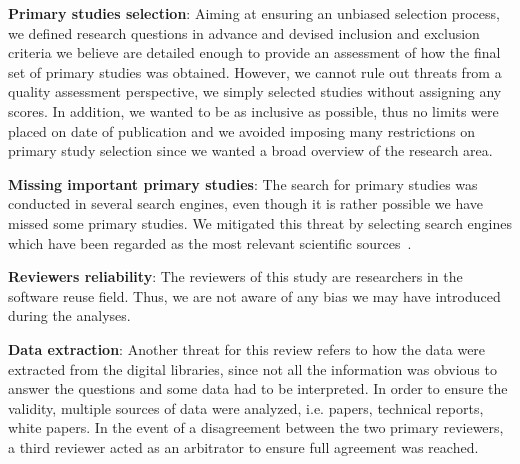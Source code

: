 
\textbf{Primary studies selection}: Aiming at ensuring an unbiased selection process, we defined research questions in advance and devised inclusion and exclusion criteria we believe are detailed enough to provide an assessment of how the final set of primary studies was obtained. However, we cannot rule out threats from a quality assessment perspective, we simply selected studies without assigning any scores. In addition, we wanted to be as inclusive as possible, thus no limits were placed on date of publication and we avoided imposing many restrictions on primary study selection since we wanted a broad overview of the research area. 

\textbf{Missing important primary studies}: The search for primary studies was conducted in several search engines, even though it is rather possible we have missed some primary studies. We mitigated this threat by selecting search engines which have been regarded as the most relevant scientific sources~\cite{Kitchenham}. 

\textbf{Reviewers reliability}: The reviewers of this study are researchers in the software reuse field. Thus, we are not aware of any bias we may have introduced during the analyses.

 \textbf{Data extraction}: Another threat for this review refers to how the data were extracted from the digital libraries, since not all the information was obvious to answer the questions and some data had to be interpreted. In order to ensure the validity, multiple sources of data were analyzed, i.e. papers, technical reports, white papers. In the event of a disagreement between the two primary reviewers, a third reviewer acted as an arbitrator to ensure full agreement was reached.